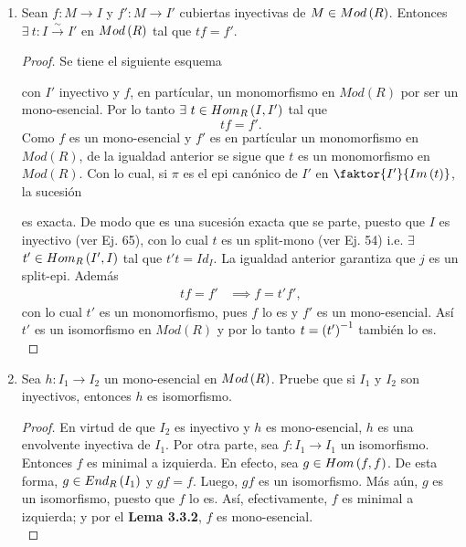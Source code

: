 \documentclass{article}
\begin{document}
\begin{enumerate}[label=\textbf{Ej \arabic*.}]
		\item Sean $f:M\to I$ y $f':M\to I'$ cubiertas inyectivas de $M\in Mod\left(R\right)$. Entonces $\exists\ t:I\overset{\sim}{\to} I'$ en $Mod\left(R\right)$ tal que $tf=f'$.
		\begin{proof}
			Se tiene el siguiente esquema
			\begin{center}
			\end{center}
			con $I'$ inyectivo y $f$, en partícular, un monomorfismo en $Mod(R)$ por ser un mono-esencial. Por lo tanto $\exists\ t\in\functhom{I}{I'}{R}$ tal que \begin{equation*}
				tf=f'.
			\end{equation*} 
			Como $f$ es un mono-esencial y $f'$ es en  partícular un monomorfismo en $Mod(R)$, de la igualdad anterior se sigue que $t$ es un monomorfismo en $Mod(R)$. Con lo cual, si $\pi$ es el epi canónico de $I'$ en $\faktor{I'}{Im\lrprth{t}}$, la sucesión
			\begin{center}
			\end{center}
			es exacta. De modo que es una sucesión exacta que se parte, puesto que $I$ es inyectivo (ver Ej. 65), con lo cual $t$ es un split-mono (ver Ej. 54) i.e. $\exists$ $t'\in\functhom{I'}{I}{R}$ tal que $t't=Id_I$. La igualdad anterior garantiza que $j$ es un split-epi. Además
			\begin{align*}
				tf=f'&\implies f=t'f',
			\end{align*}
			con lo cual $t'$ es un monomorfismo, pues $f$ lo es y $f'$ es un mono-esencial. Así $t'$ es un isomorfismo en $Mod(R)$ y por lo tanto $t=\left(t'\right)^{-1}$ también lo es.\\
		\end{proof}
		
		\item Sea $h:I_{1} \longrightarrow I_{2}$ un mono-esencial en $Mod\left(R\right)$. Pruebe que si $I_{1}$ y $I_{2}$ son inyectivos, entonces $h$ es isomorfismo.
		\begin{proof}
			En virtud de que $I_{2}$ es inyectivo y $h$ es mono-esencial, $h$ es una envolvente inyectiva de $I_{1}$. Por otra parte, sea $f:I_{1} \longrightarrow I_{1}$ un isomorfismo. Entonces $f$ es minimal a izquierda. En efecto, sea $g \in Hom\left(f,f\right)$. De esta forma, $g \in End_{R}\left(I_{1}\right)$ y $gf=f$. Luego, $gf$ es un isomorfismo. Más aún, $g$ es un isomorfismo, puesto que $f$ lo es. Así, efectivamente, $f$ es minimal a izquierda; y por el \textbf{Lema 3.3.2}, $f$ es mono-esencial.\\
			

\end{proof}
\end{enumerate}
\end{document}
